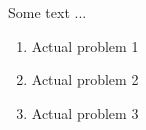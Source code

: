 


Some text ...


\begin{enumerate}[left=0pt, label={\textbf{Problem \arabic*:}}, align=left, labelsep=1em]


    \item Actual problem 1
    
    \item Actual problem 2
    
    \item Actual problem 3

\end{enumerate}